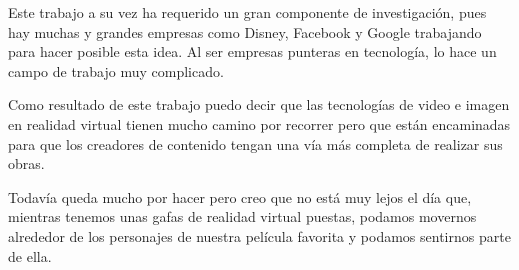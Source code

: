 Este trabajo a su vez ha requerido un gran componente de investigación, pues hay muchas y grandes empresas como Disney, Facebook y Google trabajando para hacer posible esta idea. Al ser empresas punteras en tecnología, lo hace un campo de trabajo muy complicado.

Como resultado de este trabajo puedo decir que las tecnologías de video e imagen en realidad virtual tienen mucho camino por recorrer pero que están encaminadas para que los creadores de contenido tengan una vía más completa de realizar sus obras.

Todavía queda mucho por hacer pero creo que no está muy lejos el día que, mientras tenemos unas gafas de realidad virtual puestas, podamos movernos alrededor de los personajes de nuestra película favorita y podamos sentirnos parte de ella.



